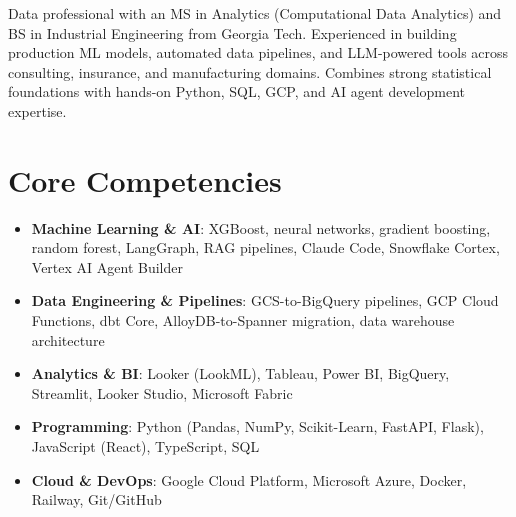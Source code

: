 \documentclass[11pt,a4paper,sans]{moderncv}
\begin{document}
\makecvtitle


\vspace{6pt}
\small{Data professional with an MS in Analytics (Computational Data Analytics) and BS in Industrial Engineering from Georgia Tech. Experienced in building production ML models, automated data pipelines, and LLM-powered tools across consulting, insurance, and manufacturing domains. Combines strong statistical foundations with hands-on Python, SQL, GCP, and AI agent development expertise.}


\section{Core Competencies}
\vspace{1pt}
\begin{itemize}

\item \textbf{Machine Learning \& AI}: XGBoost, neural networks, gradient boosting, random forest, LangGraph, RAG pipelines, Claude Code, Snowflake Cortex, Vertex AI Agent Builder

\item \textbf{Data Engineering \& Pipelines}: GCS-to-BigQuery pipelines, GCP Cloud Functions, dbt Core, AlloyDB-to-Spanner migration, data warehouse architecture

\item \textbf{Analytics \& BI}: Looker (LookML), Tableau, Power BI, BigQuery, Streamlit, Looker Studio, Microsoft Fabric

\item \textbf{Programming}: Python (Pandas, NumPy, Scikit-Learn, FastAPI, Flask), JavaScript (React), TypeScript, SQL

\item \textbf{Cloud \& DevOps}: Google Cloud Platform, Microsoft Azure, Docker, Railway, Git/GitHub

\end{itemize}

\end{document}

